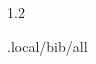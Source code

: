 \documentclass{.local/lib/classes/ndvr-super-article-standalone}
\begin{document}
    \begin{spacing}{1.2}
        \begin{btSect}{.local/bib/all}
            \btPrintCited
        \end{btSect}
    \end{spacing}
\end{document}
